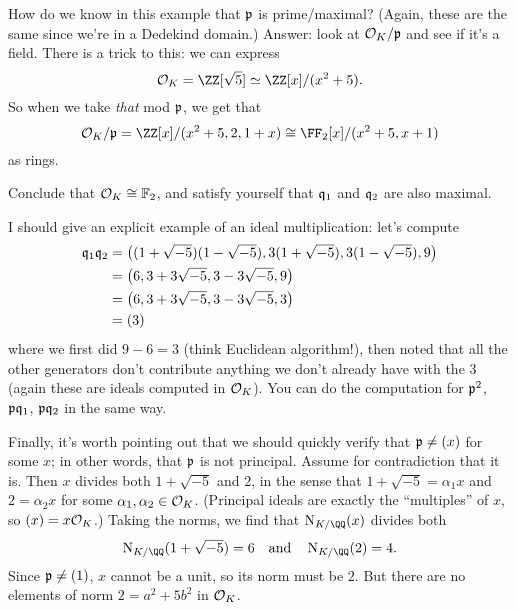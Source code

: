 How do we know in this example that $\mathfrak p$ is prime/maximal?
(Again, these are the same since we're in a Dedekind domain.)
Answer: look at $\mathcal O_K / \mathfrak p$ and see if it's a field.
There is a trick to this: we can express
\[ \OO_K = \ZZ[\sqrt5] \simeq \ZZ[x] / (x^2+5). \]
So when we take \emph{that} mod $\mathfrak p$, we get that
\[ \OO_K / \pp = \ZZ[x] / (x^2+5, 2, 1+x) \cong \FF_2[x] / (x^2+5,x+1) \]
as rings.
\begin{ques}
	Conclude that $\mathcal O_K \cong \mathbb F_2$,
	and satisfy yourself that $\mathfrak q_1$ and $\mathfrak q_2$ are also maximal.
\end{ques}
I should give an explicit example of an ideal multiplication: let's compute
\begin{align*}
	\mathfrak q_1\mathfrak q_2 &= \left( (1+\sqrt{-5})(1-\sqrt{-5}), 3(1+\sqrt{-5}), 3(1-\sqrt{-5}), 9 \right) \\
	&= \left( 6, 3+3\sqrt{-5}, 3-3\sqrt{-5}, 9 \right) \\
	&= \left( 6, 3+3\sqrt{-5}, 3-3\sqrt{-5}, 3 \right) \\
	&= (3)
\end{align*}
where we first did $9-6=3$ (think Euclidean algorithm!),
then noted that all the other generators don't contribute
anything we don't already have with the $3$
(again these are ideals computed in $\mathcal O_K$).
You can do the computation for $\mathfrak p^2$, $\mathfrak p\mathfrak q_1$, $\mathfrak p\mathfrak q_2$ in the same way.

Finally, it's worth pointing out that we should quickly verify that $\mathfrak p \neq (x)$ for some $x$;
in other words, that $\mathfrak p$ is not principal.
Assume for contradiction that it is.
Then $x$ divides both $1+\sqrt{-5}$ and $2$, in the sense
that $1+\sqrt{-5} = \alpha_1 x$ and $2 = \alpha_2 x$
for some $\alpha_1, \alpha_2 \in \mathcal O_K$.
(Principal ideals are exactly the ``multiples'' of $x$, so $(x) = x \mathcal O_K$.)
Taking the norms, we find that $\Norm_{K/\QQ}(x)$ divides both 
\[ \Norm_{K/\QQ}(1+\sqrt{-5}) = 6 \quad\text{and}\quad \Norm_{K/\QQ}(2) = 4. \]
Since $\mathfrak p \neq (1)$, $x$ cannot be a unit, so its norm must be $2$.
But there are no elements of norm $2 = a^2+5b^2$ in $\mathcal O_K$.

